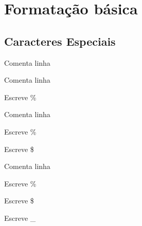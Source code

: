 \section{Formatação básica} %

\subsection{Caracteres Especiais} %
\label{sub:caracteres_especiais}

\label{sub:formata_o_b_sica}
\begin{frame}
	\begin{description}[maiortextodomundoqueconsigoes]
		\item [{\code \%}]    Comenta linha
	\end{description}
\end{frame}

\begin{frame}
	\begin{description}[maiortextodomundoqueconsigoes]
		\item [{\code \%}]    Comenta linha
		\item [{\code \textbackslash \%}]    Escreve \%
	\end{description}
\end{frame}

\begin{frame}
	\begin{description}[maiortextodomundoqueconsigoes]
		\item [{\code \%}]    Comenta linha
		\item [{\code \textbackslash \%}]    Escreve \%
		\item [{\code \textbackslash \$}]    Escreve \$
	\end{description}
\end{frame}


\begin{frame}
	\begin{description}[maiortextodomundoqueconsigoes]
		\item [{\code \%}]    Comenta linha
		\item [{\code \textbackslash \%}]    Escreve \%
		\item [{\code \textbackslash \$}]    Escreve \$
		\item [{\code \textbackslash \_}]    Escreve \_
	\end{description}
\end{frame}

